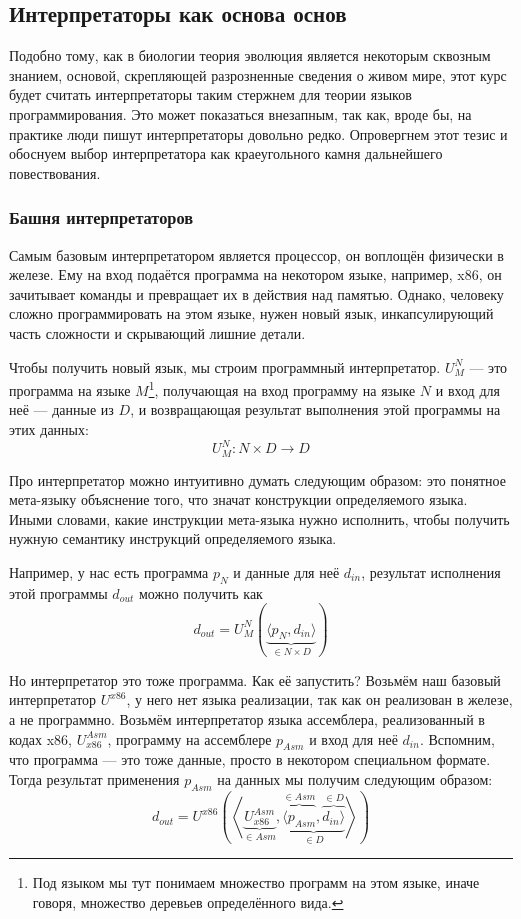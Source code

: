 
\subsection{Интерпретаторы как основа основ}

Подобно тому, как в биологии теория эволюция является некоторым сквозным знанием, основой, скрепляющей разрозненные сведения о живом мире, этот курс будет считать интерпретаторы таким стержнем для теории языков программирования.
Это может показаться внезапным, так как, вроде бы, на практике люди пишут интерпретаторы довольно редко.
Опровергнем этот тезис и обоснуем выбор интерпретатора как краеугольного камня дальнейшего повествования.

\subsubsection{Башня интерпретаторов} \label{subsec:interpreters-tower}

Самым базовым интерпретатором является процессор, он воплощён физически в железе.
Ему на вход подаётся программа на некотором языке, например, x86, он зачитывает команды и превращает их в действия над памятью.
Однако, человеку сложно программировать на этом языке, нужен новый язык, инкапсулирующий часть сложности и скрывающий лишние детали.

Чтобы получить новый язык, мы строим программный интерпретатор.
 $U_M^N$ --- это программа на языке $M$\footnote{Под языком мы тут понимаем множество программ на этом языке, иначе говоря, множество деревьев определённого вида.}, получающая на вход программу на языке $N$ и вход для неё --- данные из $D$, и возвращающая результат выполнения этой программы на этих данных: \[U_M^N : N\times D\to D\]

Про интерпретатор можно интуитивно думать следующим образом: это понятное мета-языку объяснение того, что значат конструкции определяемого языка.
Иными словами, какие инструкции мета-языка нужно исполнить, чтобы получить нужную семантику инструкций определяемого языка.

Например, у нас есть программа $p_N$ и данные для неё $d_{in}$, результат исполнения этой программы $d_{out}$ можно получить как \[d_{out} = U_M^N\left( \underbrace{\langle p_N, d_{in} \rangle}_{\in N\times D} \right)\]

Но интерпретатор это тоже программа.
Как её запустить?
Возьмём наш базовый интерпретатор $U^{x86}$, у него нет языка реализации, так как он реализован в железе, а не программно.
Возьмём интерпретатор языка ассемблера, реализованный в кодах x86, $U_{x86}^{Asm}$, программу на ассемблере $p_{Asm}$ и вход для неё $d_{in}$.
Вспомним, что программа --- это тоже данные, просто в некотором специальном формате.
Тогда результат применения $p_{Asm}$ на данных мы получим следующим образом:
\[
    d_{out} = U^{x86}\left(\left<\underbrace{U_{x86}^{Asm}}_{\in Asm}, \underbrace{\overbrace{\langle p_{Asm}}^{\in Asm}, \overbrace{d_{in} \rangle}^{\in D}}_{\in D} \right>\right)
\]

